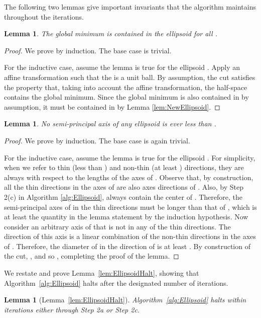 \documentclass[11pt,letter]{article}
\newcounter{nTheorems}
\numberwithin{nTheorems}{section}
\newtheorem{lemma}[nTheorems]{Lemma}
\newtheorem*{lemma*}{Lemma}
\begin{document}
The following two lemmas give important invariants that the algorithm maintains throughout the iterations.

\begin{lemma}
The global minimum is contained in the ellipsoid  for all .
\end{lemma}

\begin{proof}
We prove by induction.
The base case is trivial.

For the inductive case, assume the lemma is true for the ellipsoid .
Apply an affine transformation such that the  is a unit ball.
By assumption, the cut  satisfies the property that, taking into account the affine transformation, the half-space  contains the global minimum.
Since the global minimum is also contained in  by assumption, it must be contained in  by Lemma \ref{lem:NewEllipsoid}.
\end{proof}

\begin{lemma}
\label{lem:AxesLB}
No semi-principal axis of any ellipsoid  is ever less than .
\end{lemma}

\begin{proof}
We prove by induction.
The base case is again trivial.

For the inductive case, assume the lemma is true for the ellipsoid .
For simplicity, when we refer to thin (less than ) and non-thin (at least ) directions, they are always with respect to the lengths of the axes of .
Observe that, by construction, all the thin directions in the axes of  are also axes directions of .
Also, by Step 2(c) in Algorithm \ref{alg:Ellipsoid},  always contain the center of .
Therefore, the semi-principal axes of  in the thin directions must be longer than that of , which is at least the quantity in the lemma statement by the induction hypothesis.
Now consider an arbitrary axis  of  that is not in any of the thin directions.
The direction of this axis is a linear combination of the non-thin directions in the axes of .
Therefore, the diameter of  in the direction of  is at least .
By construction of the cut, , and so
,
completing the proof of the lemma.
\end{proof}

We restate and prove Lemma~\ref{lem:EllipsoidHalt}, showing that Algorithm~\ref{alg:Ellipsoid} halts after the designated number of iterations.
\begin{lemma*}[Lemma~\ref{lem:EllipsoidHalt}]
Algorithm~\ref{alg:Ellipsoid} halts within  iterations either through Step 2a or Step 2c.
\end{lemma*}
\end{document}
